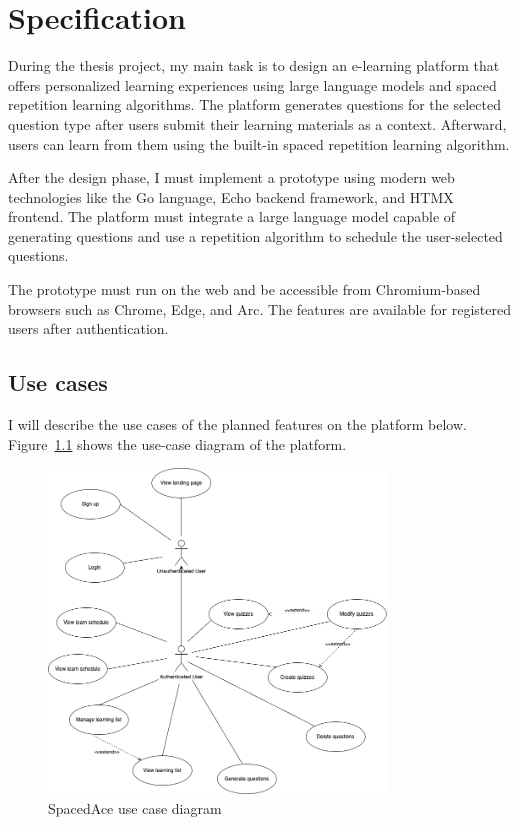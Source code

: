\chapter{Specification}\label{ch:specification}

During the thesis project, my main task is to design an e-learning platform that offers personalized learning experiences using large language models and spaced repetition learning algorithms. The platform generates questions for the selected question type after users submit their learning materials as a context. Afterward, users can learn from them using the built-in spaced repetition learning algorithm.

After the design phase, I must implement a prototype using modern web technologies like the Go language, Echo backend framework, and HTMX frontend. The platform must integrate a large language model capable of generating questions and use a repetition algorithm to schedule the user-selected questions.

The prototype must run on the web and be accessible from Chromium-based browsers such as Chrome, Edge, and Arc. The features are available for registered users after authentication.

\section{Use cases}

I will describe the use cases of the planned features on the platform below. Figure~\ref{fig:use-case} shows the use-case diagram of the platform.

\begin{figure}[H]
    \centering
    \includegraphics[width=0.8\textwidth, keepaspectratio]{figures/use-case.png}
    \caption{SpacedAce use case diagram}
    \label{fig:use-case}
\end{figure}

